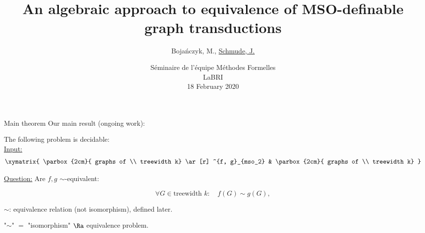 
\title[An approach to MSO-transductions]{An algebraic approach to equivalence of MSO-definable graph transductions}

\author[Schmude, J.]{
	Boja{\'n}czyk, M., \underline{Schmude, J.} }


\date[18 February 2020]{S{\'e}minaire de l'{\'e}quipe M{\'e}thodes Formelles \\LaBRI\\18 February 2020}

\begin{frame}%
	\titlepage 
\end{frame}	
\begin{frame}{Main theorem}
	Our main result (ongoing work):
	\begin{tw}The following problem is decidable:\\
		\underline{Input:}
		$$
		\xymatrix{
			\parbox{2cm}{
				graphs of \\ treewidth k}	\ar[r] ^{f, g}_{mso_2} &	\parbox{2cm}{
				graphs of \\ treewidth k}	
		}
		$$
		
		\underline{Question:} Are $f,g$ $\sim$-equivalent:
		
		$$
			\forall G \in \text{treewidth } k: \quad f(G) \sim g(G),
		$$
		
		$\sim$: equivalence relation (not isomorphism), defined later.
	\end{tw}
\pause
"$\sim$" $=$ "isomorphism" $\Ra$ equivalence problem.
\end{frame}

